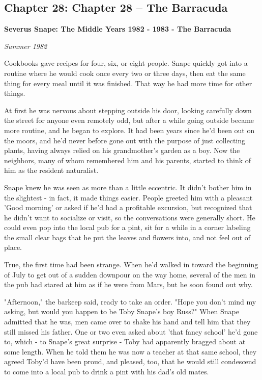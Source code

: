 \documentclass[a4paper,11pt]{article}
\begin{document}
\subsection{Chapter 28: Chapter 28 – The Barracuda}

\textbf{Severus Snape: The Middle Years 1982 - 1983 - The Barracuda}

\emph{Summer 1982}

Cookbooks gave recipes for four, six, or eight people. Snape quickly got into a routine where he would cook once every two or three days, then eat the same thing for every meal until it was finished. That way he had more time for other things.

At first he was nervous about stepping outside his door, looking carefully down the street for anyone even remotely odd, but after a while going outside became more routine, and he began to explore. It had been years since he'd been out on the moors, and he'd never before gone out with the purpose of just collecting plants, having always relied on his grandmother's garden as a boy. Now the neighbors, many of whom remembered him and his parents, started to think of him as the resident naturalist.

Snape knew he was seen as more than a little eccentric. It didn't bother him in the slightest - in fact, it made things easier. People greeted him with a pleasant 'Good morning' or asked if he'd had a profitable excursion, but recognized that he didn't want to socialize or visit, so the conversations were generally short. He could even pop into the local pub for a pint, sit for a while in a corner labeling the small clear bags that he put the leaves and flowers into, and not feel out of place.

True, the first time had been strange. When he'd walked in toward the beginning of July to get out of a sudden downpour on the way home, several of the men in the pub had stared at him as if he were from Mars, but he soon found out why.

"Afternoon," the barkeep said, ready to take an order. "Hope you don't mind my asking, but would you happen to be Toby Snape's boy Russ?" When Snape admitted that he was, men came over to shake his hand and tell him that they still missed his father. One or two even asked about 'that fancy school' he'd gone to, which - to Snape's great surprise - Toby had apparently bragged about at some length. When he told them he was now a teacher at that same school, they agreed Toby'd have been proud, and pleased, too, that he would still condescend to come into a local pub to drink a pint with his dad's old mates.
\end{document}
